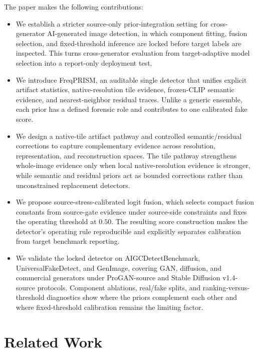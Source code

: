 \documentclass[lettersize,journal]{IEEEtran}
\begin{document}
The paper makes the following contributions:
\begin{itemize}
    \item We establish a stricter source-only prior-integration setting for cross-generator AI-generated image detection, in which component fitting, fusion selection, and fixed-threshold inference are locked before target labels are inspected. This turns cross-generator evaluation from target-adaptive model selection into a report-only deployment test.
    \item We introduce FreqPRISM, an auditable single detector that unifies explicit artifact statistics, native-resolution tile evidence, frozen-CLIP semantic evidence, and nearest-neighbor residual traces. Unlike a generic ensemble, each prior has a defined forensic role and contributes to one calibrated fake score.
    \item We design a native-tile artifact pathway and controlled semantic/residual corrections to capture complementary evidence across resolution, representation, and reconstruction spaces. The tile pathway strengthens whole-image evidence only when local native-resolution evidence is stronger, while semantic and residual priors act as bounded corrections rather than unconstrained replacement detectors.
    \item We propose source-stress-calibrated logit fusion, which selects compact fusion constants from source-gate evidence under source-side constraints and fixes the operating threshold at $0.50$. The resulting score construction makes the detector's operating rule reproducible and explicitly separates calibration from target benchmark reporting.
    \item We validate the locked detector on AIGCDetectBenchmark, UniversalFakeDetect, and GenImage, covering GAN, diffusion, and commercial generators under ProGAN-source and Stable Diffusion v1.4-source protocols. Component ablations, real/fake splits, and ranking-versus-threshold diagnostics show where the priors complement each other and where fixed-threshold calibration remains the limiting factor.
\end{itemize}

\section{Related Work}
\label{sec:related_work}
\end{document}
